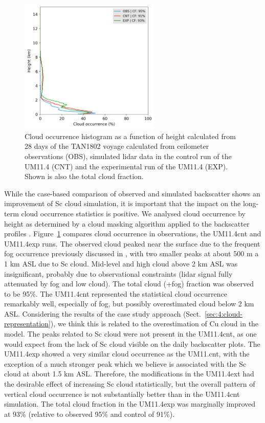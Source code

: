 \begin{figure}[t]
\centering
\includegraphics[width=0.6\textwidth]{chapter4/fig/cloud_occurrence.png}
\caption[Cloud occurrence histogram as a function of height]{
Cloud occurrence histogram as a function of height calculated from
28 days of the TAN1802 voyage calculated from ceilometer observations (OBS),
simulated lidar data in the control run of the UM11.4 (CNT) and
the experimental run of the UM11.4 (EXP).
Shown is also the total cloud fraction.
}
\label{fig:4:cloud-occurrence}
\end{figure}

While the case-based comparison of observed and simulated backscatter
shows an improvement of Sc cloud simulation, it is important that the impact
on the long-term cloud occurrence statistics is positive. We analysed
cloud occurrence by height as determined by a cloud masking algorithm
applied to the backscatter profiles \citep{kuma2020b}.
Figure~\ref{fig:4:cloud-occurrence} compares cloud occurrence in observations,
the UM11.4cnt and UM11.4exp runs. The observed cloud peaked near the surface due to
the frequent fog occurrence previously discussed in \cite{kuma2020a},
with two smaller peaks at about 500 m a 1 km ASL due to Sc cloud.
Mid-level and high cloud above 2 km ASL was insignificant, probably due
to observational constraints (lidar signal fully attenuated by fog and low
cloud). The total cloud (+fog) fraction was observed to be 95\%.
The UM11.4cnt represented the statistical cloud occurrence remarkably well,
especially of fog, but possibly overestimated cloud below 2 km ASL. Considering
the results of the case study approach (Sect.~\ref{sec:4:cloud-representation}), we think this is related to the
overestimation of Cu cloud in the model. The peaks related to Sc cloud were not present in the UM11.4cnt, as one would expect from the lack of Sc cloud
visible on the daily backscatter plots. The UM11.4exp showed a very similar
cloud occurrence as the UM11.cnt, with the exception of a much stronger peak which we believe is  associated with the Sc cloud at about 1.5 km ASL. Therefore, the modifications
in the UM11.4ext had the desirable effect of increasing Sc cloud statistically,
but the overall pattern of vertical cloud occurrence is not substantially better
than in the UM11.4cnt simulation. The total cloud fraction in the UM11.4exp was marginally
improved at 93\% (relative to observed 95\% and control of 91\%).

